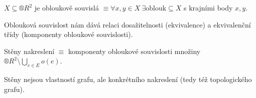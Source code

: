 \documentclass[12pt]{article}					%
\begin{document}
        \begin{definice}
            $X \subseteq ®R^2$ je obloukově souvislá $≡ \forall x, y \in X\ \exists\text{oblouk}\subseteq X$ s krajními body $x, y$.

            Oblouková souvislost nám dává relaci dosažitelnosti (ekvivalence) a ekvivalenční třídy (komponenty obloukové souvislosti).
        \end{definice}

        \begin{definice}
            Stěny nakreslení $≡$ komponenty obloukové souvislosti množiny $®R^2 \setminus \bigcup_{e \in E} o(e)$.
        \end{definice}

        \begin{upozorneni}
            Stěny nejsou vlastností grafu, ale konkrétního nakreslení (tedy též topologického grafu).
        \end{upozorneni}
\end{document}
